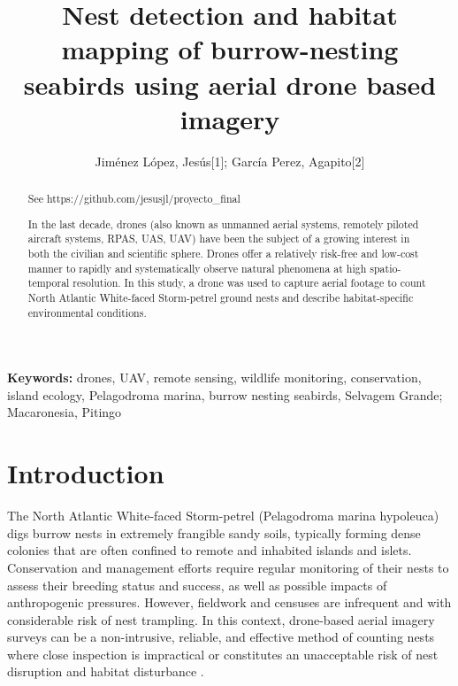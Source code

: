 \documentclass[12pt]{article}
\begin{document}
\title{Nest detection and habitat mapping of burrow-nesting seabirds using aerial drone based imagery}

\author{Jiménez López, Jesús[1]; García Perez, Agapito[2]}


\maketitle
\begin{abstract}
	
See https://github.com/jesusjl/proyecto\_final

In the last decade, drones (also known as unmanned aerial systems, remotely piloted aircraft systems, RPAS, UAS, UAV) have been the subject of a growing interest in both the civilian and scientific sphere. Drones offer a relatively risk-free and low-cost manner to rapidly and systematically observe natural phenomena at high spatio-temporal resolution. In this study, a drone was used to capture aerial footage to count North Atlantic White-faced Storm-petrel ground nests and describe habitat-specific environmental conditions.

\end{abstract}

{\bf Keywords:} drones, UAV, remote sensing, wildlife monitoring, conservation, island ecology, Pelagodroma marina, burrow nesting seabirds, Selvagem Grande; Macaronesia, Pitingo

\section{Introduction}

The North Atlantic White-faced Storm-petrel (Pelagodroma marina hypoleuca) digs burrow nests in extremely frangible sandy soils, typically forming dense colonies that are often confined to remote and inhabited islands and islets. Conservation and management efforts require regular monitoring of their nests to assess their breeding status and success, as well as possible impacts of anthropogenic pressures. However, fieldwork and censuses are infrequent and with considerable risk of nest trampling. In this context, drone-based aerial imagery surveys can be a non-intrusive, reliable, and effective method of counting nests where close inspection is impractical or constitutes an unacceptable risk of nest disruption and habitat disturbance \cite{ventura_mapping_2018}. 
\end{document}
